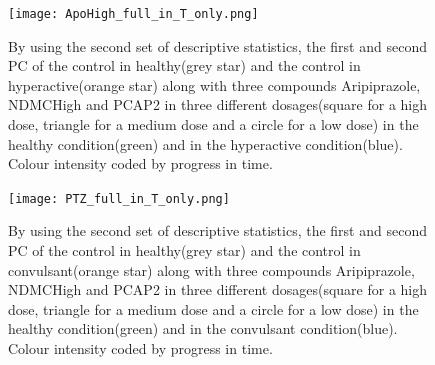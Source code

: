 \documentclass[a4paper,12pt]{article}
\begin{document}
\begin{figure}[h!]
\begin{center}
\texttt{[image: ApoHigh\_full\_in\_T\_only.png]}
\caption{By using the second set of descriptive statistics, the first and second PC of the control in healthy(grey star) and the control in hyperactive(orange star) along with three compounds Aripiprazole, NDMCHigh and PCAP2 in three different dosages(square for a high dose, triangle for a medium dose and a circle for a low dose) in the healthy condition(green) and in the hyperactive condition(blue). Colour intensity coded by progress in time.}
\end{center}
\end{figure}

\begin{figure}[h!]
\begin{center}
\texttt{[image: PTZ\_full\_in\_T\_only.png]}
\caption{By using the second set of descriptive statistics, the first and second PC of the control in healthy(grey star) and the control in convulsant(orange star) along with three compounds Aripiprazole, NDMCHigh and PCAP2 in three different dosages(square for a high dose, triangle for a medium dose and a circle for a low dose) in the healthy condition(green) and in the convulsant condition(blue). Colour intensity coded by progress in time.}
\end{center}
\end{figure}
\newpage
\end{document}
